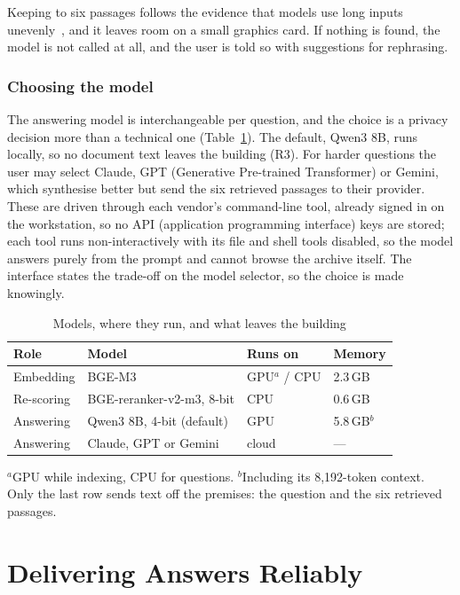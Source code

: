 \documentclass[conference]{IEEEtran}
\begin{document}
Keeping to six passages follows the evidence that models use long inputs unevenly~\cite{liu}, and it
leaves room on a small graphics card. If nothing is found, the model is not
called at all, and the user is told so with suggestions for rephrasing.

\subsubsection{Choosing the model}
\label{sec:models}
The answering model is interchangeable per question, and the choice is a privacy
decision more than a technical one (Table~\ref{tab:models}). The default, Qwen3
8B, runs locally, so no document text leaves the building (R3). For harder
questions the user may select Claude, GPT (Generative Pre-trained Transformer)
or Gemini, which synthesise better but send the six retrieved passages to their
provider. These are driven through each vendor's command-line tool, already
signed in on the workstation, so no API (application programming interface)
keys are stored; each tool runs non-interactively with its
file and shell tools disabled, so the model answers purely from the prompt and
cannot browse the archive itself. The interface states the trade-off on the
model selector, so the choice is made knowingly.

\begin{table}[t]
\caption{Models, where they run, and what leaves the building}
\label{tab:models}
\centering
\footnotesize
\begin{tabular}{@{}llll@{}}
\toprule
Role & Model & Runs on & Memory \\
\midrule
Embedding  & BGE-M3              & GPU$^{a}$ / CPU & 2.3\,GB \\
Re-scoring & BGE-reranker-v2-m3, 8-bit  & CPU & 0.6\,GB \\
Answering  & Qwen3 8B, 4-bit (default) & GPU & 5.8\,GB$^{b}$ \\
Answering  & Claude, GPT or Gemini      & cloud & --- \\
\bottomrule
\end{tabular}

\smallskip
\parbox{\columnwidth}{\scriptsize $^{a}$GPU while indexing, CPU for questions.
$^{b}$Including its 8{,}192-token context. Only the last row sends text off
the premises: the question and the six retrieved passages.}
\end{table}

\section{Delivering Answers Reliably}
\label{sec:delivery}
\end{document}
